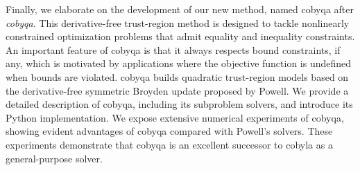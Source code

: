 Finally, we elaborate on the development of our new  method, named \gls{cobyqa} after \textit{\glsdesc{cobyqa}}.
This derivative-free trust-region  method is designed to tackle nonlinearly constrained optimization problems that admit equality and inequality constraints.
An important feature of \gls{cobyqa} is that it always respects bound constraints, if any, which is motivated by applications where the objective function is undefined when bounds are violated.
\Gls{cobyqa} builds quadratic trust-region models based on the derivative-free symmetric Broyden update proposed by Powell.
We provide a detailed description of \gls{cobyqa}, including its subproblem solvers, and introduce its Python implementation.
We expose extensive numerical experiments of \gls{cobyqa}, showing evident advantages of \gls{cobyqa} compared with Powell's  solvers.
These experiments demonstrate that \gls{cobyqa} is an excellent successor to \gls{cobyla} as a general-purpose  solver.
